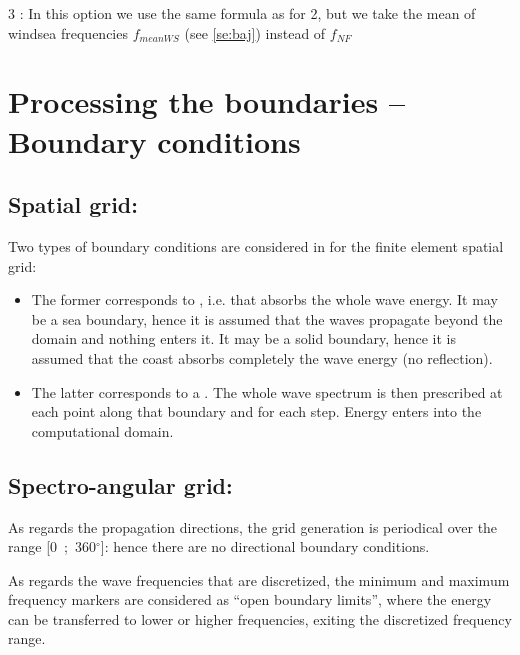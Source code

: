 3 : In this option we use the same formula as for 2, but we take the mean of windsea frequencies $f_{meanWS}$ (see \ref{se:baj}) instead of $f_{NF}$

\section{ Processing the boundaries -- Boundary conditions}

\subsection{ Spatial grid:}

 Two types of boundary conditions are considered in \tomawac for the finite element spatial grid:

\begin{itemize}
\item  The former corresponds to , i.e. that absorbs the whole wave energy. It may be a sea boundary, hence it is assumed that the waves propagate beyond the domain and nothing enters it. It may be a solid boundary, hence it is assumed that the coast absorbs completely the wave energy (no reflection).

\item  The latter corresponds to a . The whole wave spectrum is then prescribed at each point along that boundary and for each step. Energy enters into the computational domain.
\end{itemize}


\subsection{ Spectro-angular grid:}

 As regards the propagation directions, the grid generation is periodical over the range [0~;~360${}^\circ$]: hence there are no directional boundary conditions.

 As regards the wave frequencies that are discretized, the minimum and maximum frequency markers are considered as ``open boundary limits'', where the energy can be transferred to lower or higher frequencies, exiting the discretized frequency range.


